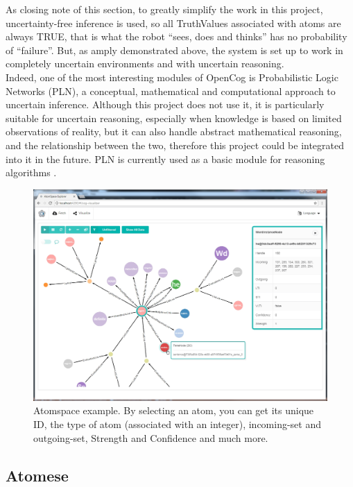 As closing note of this section, to greatly simplify the work in this project, uncertainty-free inference is used, so all TruthValues associated with atoms are always TRUE, that is what the robot \enquote{sees, does and thinks} has no probability of \enquote{failure}. But, as amply demonstrated above, the system is set up to work in completely uncertain environments and with uncertain reasoning. \\
Indeed, one of the most interesting modules of OpenCog is Probabilistic Logic Networks (PLN), a conceptual, mathematical and computational approach to uncertain inference. Although this project does not use it, it is particularly suitable for uncertain reasoning, especially when knowledge is based on limited observations of reality, but it can also handle abstract mathematical reasoning, and the relationship between the two, therefore this project could be integrated into it in the future. 
PLN is currently used as a basic module for reasoning algorithms \cite{goertzel2008probabilistic, Goertzel2011RealWorldRT}. 

\begin{figure}[h]
\centering
\includegraphics[width=1.0
\textwidth]{figures/Magistrale/atomspace_explorer}
\caption[AtomSpace Explorer ]{Atomspace example. By selecting an atom, you can get its unique ID, the type of atom (associated with an integer), incoming-set and outgoing-set, Strength and Confidence and much more.
\label{fig:atomspace_explorer}}
\end{figure}


\subsection{Atomese}\label{sec:atomese}

